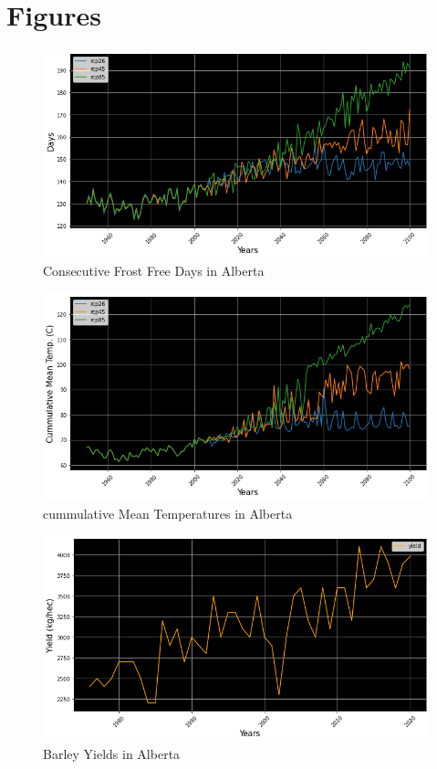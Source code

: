 \documentclass[11pt]{article}
\numberwithin{equation}{section}
\begin{document}
\section*{Figures}\label{figures}

\begin{figure}[h!]
\centering
\includegraphics[scale=0.4]{ABfrost}
\caption{Consecutive Frost Free Days in Alberta}
\label{ABfrostdays}
\end{figure}

\begin{figure}[h!]
\centering
 \includegraphics[scale=0.4]{ABtemp}
 \caption{cummulative Mean Temperatures in Alberta}
 \label{ABmeantemp}
\end{figure}

\begin{figure}[h!]
\centering
 \includegraphics[scale=0.4]{AByield}
 \caption{Barley Yields in Alberta}
 \label{ABbarleyyields}
\end{figure}
\end{document}
